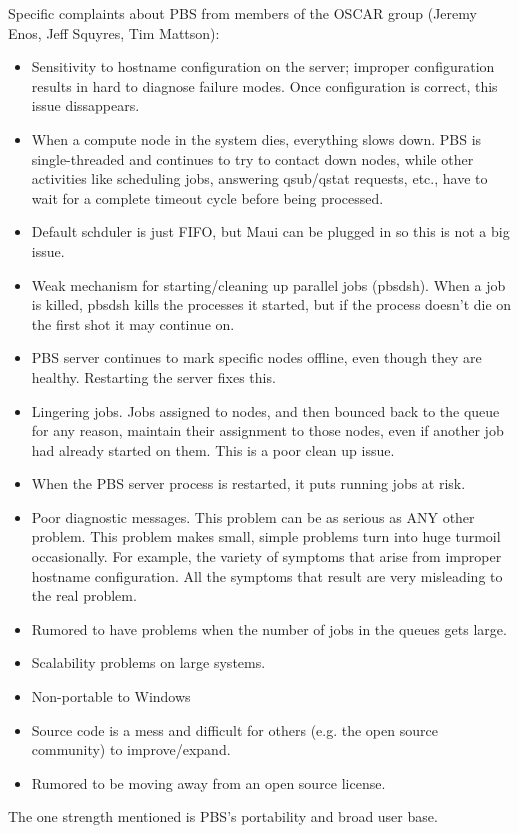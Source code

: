 Specific complaints about PBS from members of the OSCAR group (Jeremy Enos, 
Jeff Squyres, Tim Mattson):
\begin{itemize}
\item Sensitivity to hostname configuration on the server; improper 
      configuration results in hard to diagnose failure modes.  Once 
      configuration is correct, this issue dissappears.
\item When a compute node in the system dies, everything slows down.  
      PBS is single-threaded and continues to try to contact down nodes,
      while other activities like scheduling jobs, answering qsub/qstat 
      requests, etc., have to wait for a complete timeout cycle before being
      processed.
\item Default schduler is just FIFO, but Maui can be plugged in so this
      is not a big issue.
\item Weak mechanism for starting/cleaning up parallel jobs (pbsdsh).
      When a job is killed, pbsdsh kills the processes it started, but
      if the process doesn't die on the first shot it may continue on.
\item PBS server continues to mark specific nodes offline, even though they 
      are healthy.  Restarting the server fixes this.
\item Lingering jobs.  Jobs assigned to nodes, and then bounced back to the 
      queue for any reason, maintain their assignment to those nodes, even 
      if another job had already started on them.  This is a poor clean up 
      issue.
\item When the PBS server process is restarted, it puts running jobs at risk.
\item Poor diagnostic messages.  This problem can be as serious as ANY other 
      problem.  This problem makes small, simple problems turn into huge 
      turmoil occasionally.  For example, the variety of symptoms that arise 
      from improper hostname configuration.  All the symptoms that result are 
      very misleading to the real problem.
\item Rumored to have problems when the number of jobs in the queues gets
      large.
\item Scalability problems on large systems.
\item Non-portable to Windows
\item Source code is a mess and difficult for others (e.g. the open source
      community) to improve/expand.
\item Rumored to be moving away from an open source license.
\end{itemize}
The one strength mentioned is PBS's portability and broad user base.

